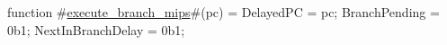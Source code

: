 function #\hyperref[zexecutezybranchzymips]{execute\_branch\_mips}#(pc) = {
  DelayedPC = pc;
  BranchPending = 0b1;
  NextInBranchDelay = 0b1;
}
